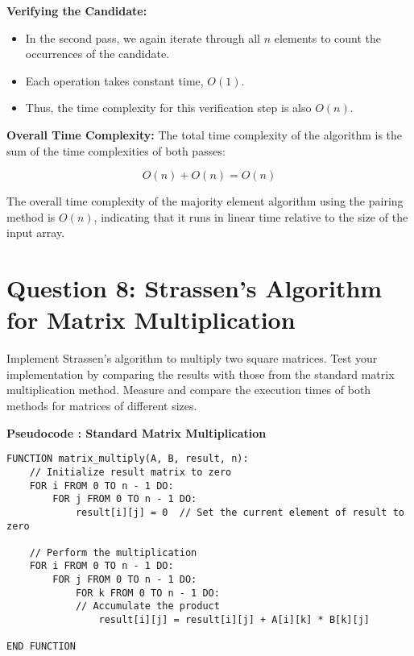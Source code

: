 \documentclass[a4paper,12pt]{report}
\begin{document}
     \textbf{Verifying the Candidate:}
    \begin{itemize}
        \item In the second pass, we again iterate through all \(n\) elements to count the occurrences of the candidate.
        \item Each operation takes constant time, \(O(1)\).
        \item Thus, the time complexity for this verification step is also \(O(n)\).
    \end{itemize}


\textbf{Overall Time Complexity:} The total time complexity of the algorithm is the sum of the time complexities of both passes:
\begin{tcolorbox}[colback=white, colframe=black, boxrule=0.5pt] %
\[
O(n) + O(n) = O(n)
\]
\end{tcolorbox}

The overall time complexity of the majority element algorithm using the pairing method is \(O(n)\), indicating that it runs in linear time relative to the size of the input array.
\vspace{100pt}
\section*{Question 8: Strassen’s Algorithm for Matrix Multiplication}
Implement Strassen’s algorithm to multiply two square matrices. Test your implementation by comparing the results with those from the standard matrix multiplication method. Measure and compare the execution times of both methods for matrices of different sizes.


\textbf{Pseudocode : Standard Matrix Multiplication }
\begin{tcolorbox}[colback=white, colframe=black, boxrule=0.5pt]
\ttfamily\small
\begin{verbatim}
FUNCTION matrix_multiply(A, B, result, n):
    // Initialize result matrix to zero
    FOR i FROM 0 TO n - 1 DO:
        FOR j FROM 0 TO n - 1 DO:
            result[i][j] = 0  // Set the current element of result to zero

    // Perform the multiplication
    FOR i FROM 0 TO n - 1 DO:
        FOR j FROM 0 TO n - 1 DO:
            FOR k FROM 0 TO n - 1 DO:
			// Accumulate the product
                result[i][j] = result[i][j] + A[i][k] * B[k][j]  

END FUNCTION
\end{verbatim}
\end{tcolorbox}
\end{document}
